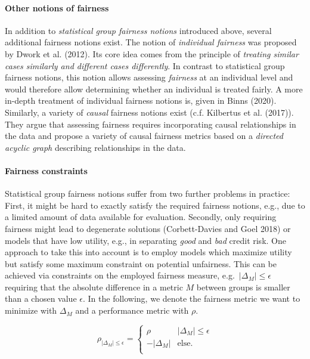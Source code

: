 \hypertarget{other-notions-of-fairness}{%
\paragraph{Other notions of fairness}\label{other-notions-of-fairness}}

In addition to \emph{statistical group fairness notions} introduced above, several additional fairness notions exist.
The notion of \emph{individual fairness} was proposed by Dwork et al. (2012).
Its core idea comes from the principle of \emph{treating similar cases similarly and different cases differently}.
In contrast to statistical group fairness notions, this notion allows assessing \emph{fairness} at an individual level and
would therefore allow determining whether an individual is treated fairly.
A more in-depth treatment of individual fairness notions is, given in Binns (2020).
Similarly, a variety of \emph{causal} fairness notions exist (c.f. Kilbertus et al. (2017)).
They argue that assessing fairness requires incorporating causal relationships in the data and propose a variety of causal fairness metrics based on a \emph{directed acyclic graph} describing relationships in the data.

\hypertarget{fairness-constraints}{%
\paragraph{Fairness constraints}\label{fairness-constraints}}

Statistical group fairness notions suffer from two further problems in practice:
First, it might be hard to exactly satisfy the required fairness notions, e.g., due to a limited amount of data available for evaluation.
Secondly, only requiring fairness might lead to degenerate solutions (Corbett-Davies and Goel 2018) or models that have low utility, e.g., in separating \emph{good} and \emph{bad} credit risk.
One approach to take this into account is to employ models which maximize utility but satisfy some maximum constraint on potential unfairness.
This can be achieved via constraints on the employed fairness measure, e.g.~\(|\Delta_M| \leq \epsilon\) requiring that the absolute difference in a metric \(M\) between groups
is smaller than a chosen value \(\epsilon\).
In the following, we denote the fairness metric we want to minimize with \(\Delta_M\) and a performance metric with \(\rho\).

\[
  \rho_{|\Delta_M| \leq \epsilon} = \left\{
\begin{array}{ll}
\rho         & |\Delta_M| \leq \epsilon      \\
- |\Delta_M| &  \textrm{else.}                \\
\end{array}
\right.
\]

